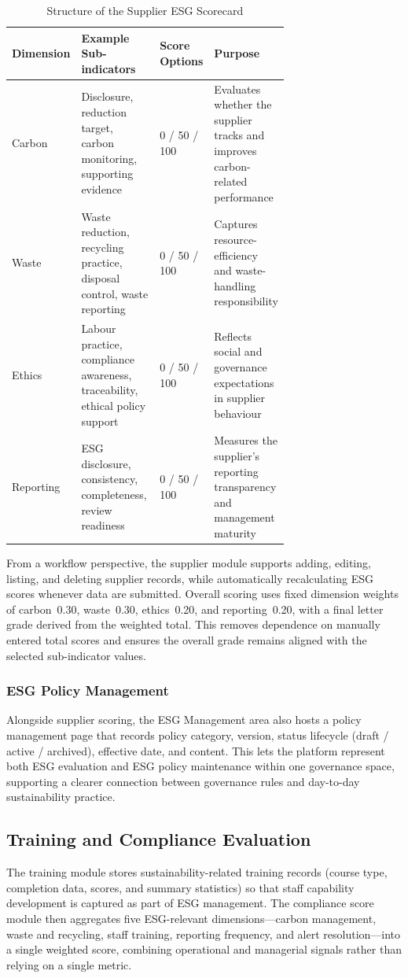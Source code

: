 \documentclass[11pt,a4paper]{article}
\begin{document}
\begin{table}[h]
\centering
\scriptsize
\begin{tabularx}{\linewidth}{@{}p{0.15\linewidth}p{0.40\linewidth}p{0.15\linewidth}X@{}}
\toprule
\textbf{Dimension} & \textbf{Example Sub-indicators} & \textbf{Score Options} & \textbf{Purpose} \\
\midrule
Carbon & Disclosure, reduction target, carbon monitoring, supporting evidence & 0 / 50 / 100 & Evaluates whether the supplier tracks and improves carbon-related performance \\
Waste & Waste reduction, recycling practice, disposal control, waste reporting & 0 / 50 / 100 & Captures resource-efficiency and waste-handling responsibility \\
Ethics & Labour practice, compliance awareness, traceability, ethical policy support & 0 / 50 / 100 & Reflects social and governance expectations in supplier behaviour \\
Reporting & ESG disclosure, consistency, completeness, review readiness & 0 / 50 / 100 & Measures the supplier's reporting transparency and management maturity \\
\bottomrule
\end{tabularx}
\caption{Structure of the Supplier ESG Scorecard}
\end{table}

From a workflow perspective, the supplier module supports adding, editing, listing, and deleting supplier records, while automatically recalculating ESG scores whenever data are submitted. Overall scoring uses fixed dimension weights of carbon~0.30, waste~0.30, ethics~0.20, and reporting~0.20, with a final letter grade derived from the weighted total. This removes dependence on manually entered total scores and ensures the overall grade remains aligned with the selected sub-indicator values.

\subsubsection{ESG Policy Management}
Alongside supplier scoring, the ESG Management area also hosts a policy management page that records policy category, version, status lifecycle (draft / active / archived), effective date, and content. This lets the platform represent both ESG evaluation and ESG policy maintenance within one governance space, supporting a clearer connection between governance rules and day-to-day sustainability practice.

\subsection{Training and Compliance Evaluation}
The training module stores sustainability-related training records (course type, completion data, scores, and summary statistics) so that staff capability development is captured as part of ESG management. The compliance score module then aggregates five ESG-relevant dimensions---carbon management, waste and recycling, staff training, reporting frequency, and alert resolution---into a single weighted score, combining operational and managerial signals rather than relying on a single metric.
\end{document}
